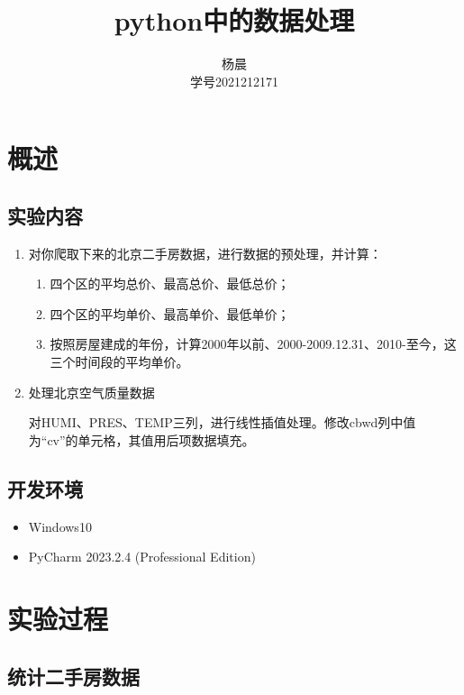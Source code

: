 \documentclass[lang=cn,11pt,a4paper]{elegantpaper}
\title{python中的数据处理}
\author{杨晨 \\学号2021212171}
\institute{北京邮电大学 计算机学院}
\date{\zhtoday}
\begin{document}
\maketitle

\section{概述}

\subsection{实验内容}

\begin{enumerate}

    \item 对你爬取下来的北京二手房数据，进行数据的预处理，并计算：
    \begin{enumerate}
        \item 四个区的平均总价、最高总价、最低总价；
        \item 四个区的平均单价、最高单价、最低单价；
        \item 按照房屋建成的年份，计算2000年以前、2000-2009.12.31、2010-至今，这三个时间段的平均单价。
    \end{enumerate}
    \item 处理北京空气质量数据
    
    对HUMI、PRES、TEMP三列，进行线性插值处理。修改cbwd列中值为“cv”的单元格，其值用后项数据填充。
\end{enumerate}

\subsection{开发环境}

\begin{itemize}
    \item Windows10
    \item PyCharm 2023.2.4 (Professional Edition)
\end{itemize}

\section{实验过程}

\subsection{统计二手房数据}
\end{document}
